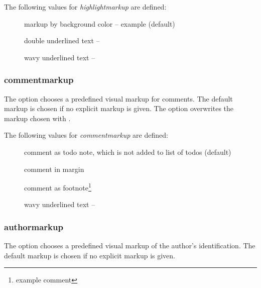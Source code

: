 The following values for \emph{highlightmarkup} are defined:

\begin{description}
	\item [] markup by background color -- \colorbox{orange!30}{example} (default)
	\item [] double underlined text -- 
	\item [] wavy underlined text -- 
\end{description}




\subsubsection{commentmarkup}


The  option chooses a predefined visual markup for comments.
The default markup is chosen if no explicit markup is given.
The option  overwrites the markup chosen with .

The following values for \emph{commentmarkup} are defined:

\begin{description}
	\item [] comment as todo note, which is not added to list of todos (default)
	\item [] comment in margin
	\item [] comment as footnote\footnote{example comment}
	\item [] wavy underlined text -- 
\end{description}



\subsubsection{authormarkup}


The  option chooses a predefined visual markup of the author's identification.
The default markup is chosen if no explicit markup is given.

